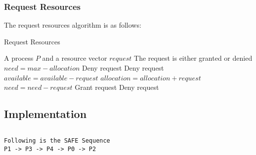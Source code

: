 \subsubsection{Request Resources}

The request resources algorithm is as follows:

\begin{algorithm}
	\caption{Request Resources}
	\label{alg:request_resources}
	\begin{algorithmic}
		\Require A process $P$ and a resource vector $request$
		\Ensure The request is either granted or denied
		\State $need = max - allocation$
		\State Deny request
		\Else
		\State Deny request
		\Else
		\State $available = available - request$
		\State $allocation = allocation + request$
		\State $need = need - request$
		\State Grant request
		\Else
		\State Deny request
		\EndIf
		\EndIf
		\EndIf
	\end{algorithmic}
\end{algorithm}

\subsection{Implementation}

\inputminted[fontsize=\footnotesize,autogobble]{c}{code/bankers.c}

\begin{lstlisting}[style=output]
Following is the SAFE Sequence
P1 -> P3 -> P4 -> P0 -> P2
\end{lstlisting}
